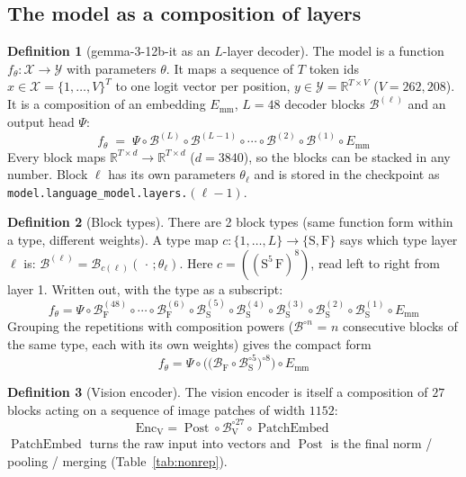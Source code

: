 \documentclass[10pt,a4paper]{article}
\newcommand{\op}[1]{\operatorname{#1}}
\theoremstyle{definition}
\newtheorem{definition}{Definition}[section]
\begin{document}
\subsection{The model as a composition of layers}\label{sec:comp}
\begin{definition}[gemma-3-12b-it as an $L$-layer decoder]
The model is a function $f_\theta:\mathcal{X}\to\mathcal{Y}$ with parameters $\theta$. It maps a sequence of $T$ token ids $x\in\mathcal{X}=\{1,\dots,V\}^{T}$ to one logit vector per position, $y\in\mathcal{Y}=\mathbb{R}^{T\times V}$ ($V=262{,}208$). It is a composition of an embedding $E_{\mathrm{mm}}$, $L=48$ decoder blocks $\mathcal{B}^{(\ell)}$ and an output head $\Psi$:
\begin{equation}
  f_\theta \;=\; \Psi\circ\mathcal{B}^{(L)}\circ\mathcal{B}^{(L-1)}\circ\cdots\circ\mathcal{B}^{(2)}\circ\mathcal{B}^{(1)}\circ E_{\mathrm{mm}}
\end{equation}
Every block maps $\mathbb{R}^{T\times d}\to\mathbb{R}^{T\times d}$ ($d=3840$), so the blocks can be stacked in any number. Block $\ell$ has its own parameters $\theta_\ell$ and is stored in the checkpoint as \texttt{model.language\_model.layers.}$(\ell-1)$.
\end{definition}
\begin{definition}[Block types]
There are 2 block types (same function form within a type, different weights). A type map $c:\{1,\dots,L\}\to\{\mathrm{S},\mathrm{F}\}$ says which type layer $\ell$ is: $\mathcal{B}^{(\ell)}=\mathcal{B}_{c(\ell)}(\,\cdot\,;\theta_\ell)$. Here $c=((\mathrm{S}^{5}\,\mathrm{F})^{8})$, read left to right from layer 1.
Written out, with the type as a subscript:
\begin{equation}
  f_\theta = \Psi\circ \mathcal{B}^{(48)}_{\mathrm{F}}\circ \cdots\circ \mathcal{B}^{(6)}_{\mathrm{F}}\circ \mathcal{B}^{(5)}_{\mathrm{S}}\circ \mathcal{B}^{(4)}_{\mathrm{S}}\circ \mathcal{B}^{(3)}_{\mathrm{S}}\circ \mathcal{B}^{(2)}_{\mathrm{S}}\circ \mathcal{B}^{(1)}_{\mathrm{S}}\circ E_{\mathrm{mm}}
\end{equation}
Grouping the repetitions with composition powers ($\mathcal{B}^{\circ n}$ = $n$ consecutive blocks of the same type, each with its own weights) gives the compact form
\begin{equation}\label{eq:compact}
  f_\theta = \Psi\circ\Big(\big(\mathcal{B}_{\mathrm{F}} \circ \mathcal{B}_{\mathrm{S}}^{\circ 5}\big)^{\circ 8}\Big)\circ E_{\mathrm{mm}}
\end{equation}
\end{definition}
\begin{definition}[Vision encoder]
The vision encoder is itself a composition of $27$ blocks acting on a sequence of image patches of width $1152$:
\begin{equation}
  \op{Enc_V} = \op{Post}\circ \mathcal{B}_{\mathrm{V}}^{\circ 27}\circ\op{PatchEmbed}
\end{equation}
$\op{PatchEmbed}$ turns the raw input into vectors and $\op{Post}$ is the final norm / pooling / merging (Table~\ref{tab:nonrep}).
\end{definition}
\end{document}
